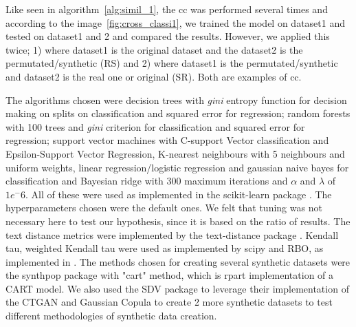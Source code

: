 Like seen in algorithm~\ref{alg:simil_1}, the \ac{cc} was performed several times and according to the image~\ref{fig:cross_classi1}, we trained the model on dataset1 and tested on dataset1 and 2 and compared the results. However, we applied this twice; 1) where dataset1 is the original dataset and the dataset2 is the permutated/synthetic (RS) and 2) where dataset1 is the permutated/synthetic and dataset2 is the real one or original (SR). Both are examples of \acl{cc}.

The algorithms chosen were decision trees with \textit{gini} entropy function for decision making on splits on classification and squared error for regression; random forests with 100 trees and \textit{gini} criterion for classification and squared error for regression; support vector machines with C-support Vector classification and Epsilon-Support Vector Regression, K-nearest neighbours with 5 neighbours and uniform weights, linear regression/logistic regression and gaussian naive bayes for classification and Bayesian ridge with 300 maximum iterations and $\alpha$ and $\lambda$ of $1e^-6$. All of these were used as implemented in the scikit-learn package \cite{scikit-learn}. The hyperparameters chosen were the default ones. We felt that tuning was not necessary here to test our hypothesis, since it is based on the ratio of results.
The text distance metrics were implemented by the text-distance package \cite{orsiniumTextdistanceComputeDistance}. Kendall tau, weighted Kendall tau were used as implemented by scipy \cite{virtanenSciPyFundamentalAlgorithms2020a} and RBO, as implemented in \cite{chenRankbiasedOverlapRBO2023}.
The methods chosen for creating several synthetic datasets were the synthpop package \cite{synthpop} with "cart" method, which is rpart implementation of a CART model. We also used  the SDV package \cite{SDV} to leverage their implementation of the CTGAN and Gaussian Copula to create 2 more synthetic datasets to test different methodologies of synthetic data creation.






